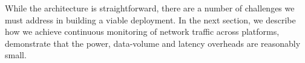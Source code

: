 
While the \meddle architecture is straightforward, there are a 
number of challenges we must address in building a viable deployment. 
In the next section, we describe how we achieve continuous monitoring 
of network traffic across platforms, demonstrate that the power, data-volume and latency 
overheads are reasonably small.







%


